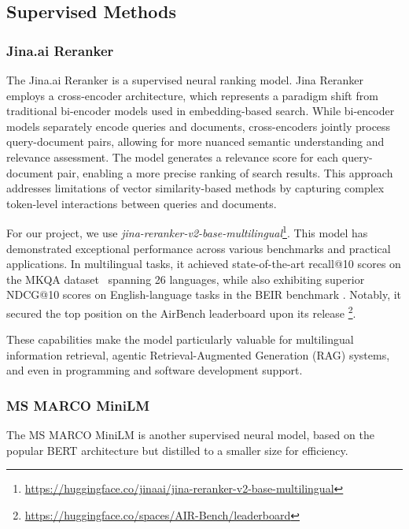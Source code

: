 \subsection{Supervised Methods}\label{subsec:supervised-methods}

\subsubsection{Jina.ai Reranker}
The Jina.ai Reranker is a supervised neural ranking model.
Jina Reranker employs a cross-encoder architecture, which represents a paradigm shift from traditional bi-encoder models used in embedding-based search.
While bi-encoder models separately encode queries and documents, cross-encoders jointly process query-document pairs, allowing for more nuanced semantic understanding and relevance assessment.
The model generates a relevance score for each query-document pair, enabling a more precise ranking of search results.
This approach addresses limitations of vector similarity-based methods by capturing complex token-level interactions between queries and documents.

For our project, we use \textit{jina-reranker-v2-base-multilingual}\footnote{\url{https://huggingface.co/jinaai/jina-reranker-v2-base-multilingual}}.
This model has demonstrated exceptional performance across various benchmarks and practical applications.
In multilingual tasks, it achieved state-of-the-art recall@10 scores on the MKQA dataset~\cite{mkqa} spanning 26 languages, while also exhibiting superior NDCG@10 scores on English-language tasks in the BEIR benchmark \cite{thakur2021beirheterogenousbenchmarkzeroshot}.
Notably, it secured the top position on the AirBench leaderboard upon its release \footnote{\url{https://huggingface.co/spaces/AIR-Bench/leaderboard}}.

These capabilities make the model particularly valuable for multilingual information retrieval, agentic Retrieval-Augmented Generation (RAG) systems, and even in programming and software development support.

\subsubsection{MS MARCO MiniLM}
The MS MARCO MiniLM is another supervised neural model, based on the popular BERT architecture but distilled to a smaller size for efficiency.

